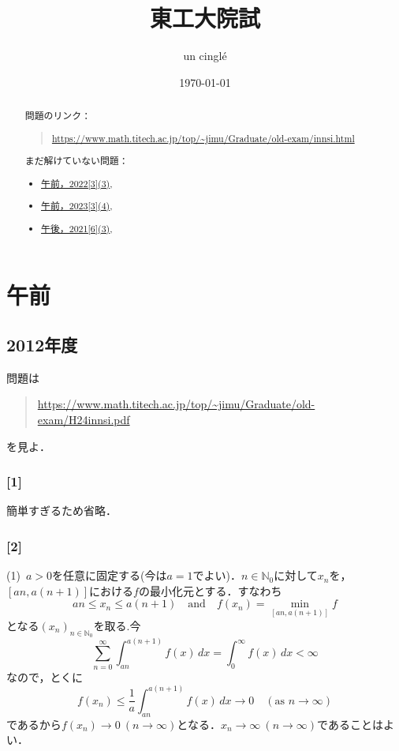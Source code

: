 \documentclass[a4j]{ltjsarticle}
\newcommand{\Nset}{\mathbb{N}}
\newcommand{\1}{\mathbbm{1}}
\numberwithin{equation}{section}
\theoremstyle{definition}
\begin{document}
\title{東工大院試}
\author{un cinglé}
\date{\today}
\maketitle
\begin{abstract}
    問題のリンク：
    \begin{quote}
        \url{https://www.math.titech.ac.jp/top/~jimu/Graduate/old-exam/innsi.html}
    \end{quote}
    まだ解けていない問題：
    \begin{itemize}
        \item \hyperref[am_2022_3]{午前，2022[3](3)},
        \item \hyperref[am_2023_3]{午前，2023[3](4)},
    
        \item \hyperref[pm_2021_6]{午後，2021[6](3)},
    \end{itemize}
\end{abstract}
\tableofcontents

\newpage 

\section{午前}
\subsection{2012年度}
問題は
\begin{quote}
    \url{https://www.math.titech.ac.jp/top/~jimu/Graduate/old-exam/H24innsi.pdf}
\end{quote}
を見よ．
\subsubsection*{[1]}
簡単すぎるため省略．
\subsubsection*{[2]}
(1)\ $a>0$を任意に固定する(今は$a=1$でよい)．$n\in\Nset_0$に対して$x_n$を，$[an,a(n+1)]$における$f$の最小化元とする．すなわち
\begin{equation}
    an\leq x_n\leq a(n+1)\quad \text{and}\quad f(x_n)=\min_{[an,a(n+1)]}f 
\end{equation}
となる$(x_n)_{n\in\Nset_{0}}$を取る.今
\begin{equation}
    \sum_{n=0}^\infty \int_{an}^{a(n+1)}f(x)\,dx=\int_{0}^\infty f(x)\,dx<\infty 
\end{equation}
なので，とくに
\begin{equation}
    f(x_n)\leq \frac{1}{a}\int_{an}^{a(n+1)}f(x)\,dx\to 0\quad (\text{as $n\to\infty $})
\end{equation}
であるから$f(x_n)\to0\ (n\to\infty)$となる．$x_n\to\infty\ (n\to\infty)$であることはよい．
\end{document}
